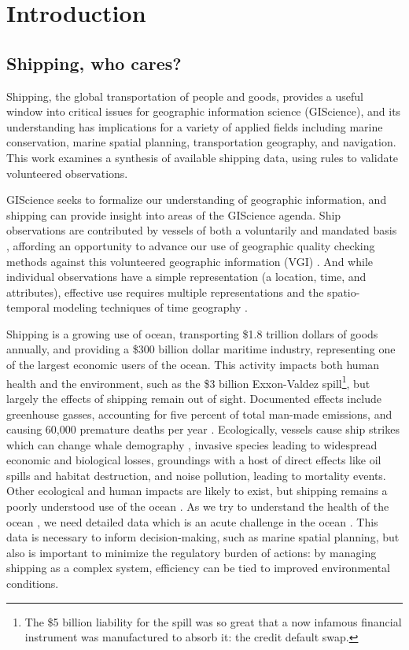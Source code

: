 \section{Introduction}


\subsection{Shipping, who cares?}

Shipping, the global transportation of people and goods, provides a useful window into critical issues for geographic information science (GIScience), and its understanding has implications for a variety of applied fields including marine conservation, marine spatial planning, transportation geography, and navigation.  This work examines a synthesis of available shipping data, using rules to validate volunteered observations.

GIScience seeks to formalize our understanding of geographic information, and shipping can provide insight into areas of the GIScience agenda. Ship observations are contributed by vessels of both a voluntarily and mandated basis \citep{VOSClim,Tetreault2002}, affording an opportunity to advance our use of geographic quality checking methods \citep{goodchildli2012} against this volunteered geographic information (VGI) \citep{goodchild2007citizens}. And while individual observations have a simple representation (a location, time, and attributes), effective use requires multiple representations \citep{Goodchild1992} and the spatio-temporal modeling techniques of time geography \citep{miller2008field}.

Shipping is a growing use of ocean, transporting \$1.8 trillion dollars of goods annually, %
and providing a \$300 billion dollar maritime industry, representing one of the largest economic users of the ocean. This activity impacts both human health and the environment, such as the \$3 billion Exxon-Valdez spill\footnote{The \$5 billion liability for the spill was so great that a now infamous financial instrument was manufactured to absorb it: the credit default swap.}, but largely the effects of shipping remain out of sight. Documented effects include greenhouse gasses, accounting for five percent of total man-made emissions, and causing 60,000 premature deaths per year \cite{Corbett2007}. Ecologically, vessels cause ship strikes which can change whale demography \citep{Fujiwara2001}, %
 invasive species leading to widespread economic and biological losses, groundings with a host of direct effects like oil spills and habitat destruction, and noise pollution, leading to mortality events. Other ecological and human impacts are likely to exist, but shipping remains a poorly understood use of the ocean \citep{Davenport2006}. As we try to understand the health of the ocean \citep{Halpern2012}, we need detailed data which is an acute challenge in the ocean \cite{Wright1997}. This data is necessary to inform decision-making, such as marine spatial planning, but also is important to minimize the regulatory burden of actions: by managing shipping as a complex system, efficiency can be tied to improved environmental conditions.

